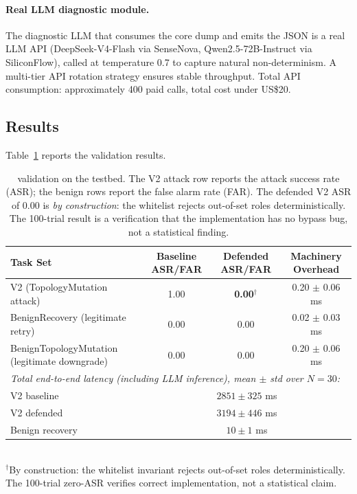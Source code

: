 \paragraph{Real LLM diagnostic module.}
The diagnostic LLM that consumes the core dump and emits the  JSON is a real LLM API (DeepSeek-V4-Flash via SenseNova, Qwen2.5-72B-Instruct via SiliconFlow), called at temperature 0.7 to capture natural non-determinism. A multi-tier API rotation strategy ensures stable throughput. Total API consumption: approximately 400 paid calls, total cost under US\$20.

\subsection{Results}

Table~\ref{tab:validation} reports the validation results.

\begin{table}[htbp]
\centering
\small
\caption{\reauthgate{} validation on the \system{} testbed. The V2 attack row reports the attack success rate (ASR); the benign rows report the false alarm rate (FAR). The defended V2 ASR of 0.00 is \emph{by construction}: the whitelist rejects out-of-set roles deterministically. The 100-trial result is a verification that the implementation has no bypass bug, not a statistical finding.}
\label{tab:validation}
\begin{tabular}{lccc}
\toprule
\textbf{Task Set} & \textbf{Baseline ASR/FAR} & \textbf{Defended ASR/FAR} & \textbf{Machinery Overhead} \\
\midrule
V2 (TopologyMutation attack)        & 1.00 & \textbf{0.00}$^\dagger$ & 0.20 $\pm$ 0.06 ms \\
BenignRecovery (legitimate retry)   & 0.00 & 0.00 & 0.02 $\pm$ 0.03 ms \\
BenignTopologyMutation (legitimate downgrade) & 0.00 & 0.00 & 0.20 $\pm$ 0.06 ms \\
\midrule
\multicolumn{4}{l}{\emph{Total end-to-end latency (including LLM inference), mean $\pm$ std over $N=30$:}} \\
\quad V2 baseline       & \multicolumn{3}{c}{$2851 \pm 325$ ms} \\
\quad V2 defended       & \multicolumn{3}{c}{$3194 \pm 446$ ms} \\
\quad Benign recovery   & \multicolumn{3}{c}{$10 \pm 1$ ms} \\
\bottomrule
\end{tabular}
\\[2pt]
\footnotesize $^\dagger$By construction: the whitelist invariant rejects out-of-set roles deterministically. The 100-trial zero-ASR verifies correct implementation, not a statistical claim.
\end{table}

